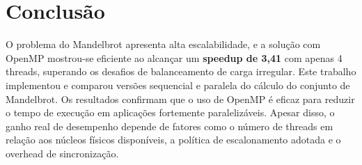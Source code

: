 \documentclass[12pt]{article}
\begin{document}
\section{Conclusão}\label{sec:conclusao}

O problema do Mandelbrot apresenta alta escalabilidade, e a solução com OpenMP mostrou-se eficiente ao alcançar um \textbf{speedup de 3,41} com apenas 4 threads, superando os desafios de balanceamento de carga irregular.
Este trabalho implementou e comparou versões sequencial e paralela do cálculo do conjunto de Mandelbrot. Os resultados confirmam que o uso de OpenMP é eficaz para reduzir o tempo de execução em aplicações fortemente paralelizáveis.
Apesar disso, o ganho real de desempenho depende de fatores como o número de threads em relação aos núcleos físicos disponíveis, a política de escalonamento adotada e o overhead de sincronização.



\end{document}

